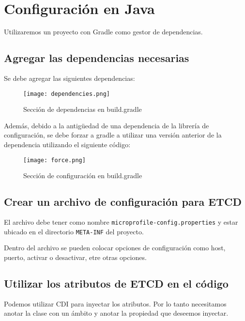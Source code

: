 \documentclass[11pt]{scrartcl} %
\begin{document}
\section{Configuración en Java}

Utilizaremos un proyecto con Gradle como gestor de dependencias.

\subsection{Agregar las dependencias necesarias}

Se debe agregar las siguientes dependencias:

\begin{figure}[h] %
	\centering
	\texttt{[image: dependencies.png]} %
	\caption{Sección de dependencias en build.gradle}
\end{figure}

Además, debido a la antigüedad de una dependencia de la librería de configuración, se debe forzar a gradle a utilizar una versión anterior de la dependencia utilizando el siguiente código:

\begin{figure}[h] %
	\centering
	\texttt{[image: force.png]} %
	\caption{Sección de configuración en build.gradle}
\end{figure}

\subsection{Crear un archivo de configuración para ETCD}

El archivo debe tener como nombre \texttt{microprofile-config.properties} y estar ubicado en el directorio \texttt{META-INF} del proyecto.

Dentro del archivo se pueden colocar opciones de configuración como host, puerto, activar o desactivar, etre otras opciones.

\subsection{Utilizar los atributos de ETCD en el código}

Podemos utilizar CDI para inyectar los atributos. Por lo tanto necesitamos anotar la clase con un ámbito y anotar la propiedad que deseemos inyectar.
\end{document}
